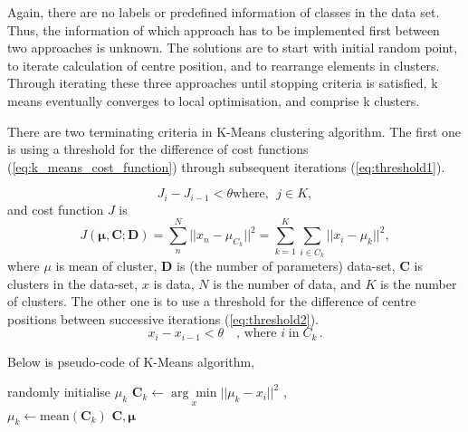 \documentclass[12pt,a4paper]{report}
\begin{document}
Again, there are no labels or predefined information of classes in the data set. %
Thus, the information of which approach has to be implemented first between two approaches is unknown. The solutions are to start with initial random point, to iterate calculation of centre position, and to rearrange elements in clusters. Through iterating these three approaches until stopping criteria is satisfied, k means eventually converges to local optimisation, and comprise k clusters. 

\bigskip
There are two terminating criteria in K-Means clustering algorithm. The first one is using a threshold for the difference of cost functions (\ref{eq:k_means_cost_function}) through subsequent iterations (\ref{eq:threshold1}).

\begin{equation} \label{eq:threshold1}
	J_i - J_{i-1} < \theta \textrm{where, } \; j \in K,
\end{equation}
and cost function $J$ is
\begin{equation} \label{eq:k_means_cost_function}
    J(\mathbf{\mu, C; D}) = \sum_n^N || x_n -\mu_{C_k} ||^2
    = \sum^K_{k=1} \sum_{i \in C_k} ||x_i - \mu_k||^2,
\end{equation}
where $\mu$ is mean of cluster, $\mathbf{D}$ is (the number of parameters) data-set, $\mathbf{C}$ is clusters in the data-set, $x$ is data, $N$ is the number of data, and $K$ is the number of clusters. The other one is to use a threshold for the difference of centre positions between successive iterations (\ref{eq:threshold2}).
\begin{equation} \label{eq:threshold2}
    x_i - x_{i-1} < \theta \quad \textrm{, where } i \; \textrm{in} \; C_k \,.
\end{equation}

\bigskip

Below is pseudo-code of K-Means algorithm, 
\bigskip
\begin{algorithmic}
	 \STATE randomly initialise $\mu_k$
\ENDFOR
\smallskip
{}
			\STATE $\mathbf{C}_k \leftarrow \underset{x}{\arg\min}|| \mu_k - x_i ||^2$ ,\\
		\ENDFOR
	\ENDFOR
	\smallskip
		\STATE $\mu_k \leftarrow \textrm{mean}(\mathbf{C}_k)$
	\ENDFOR
\ENDWHILE
\RETURN $\mathbf{C, \mu}$
\end{algorithmic}
\end{document}
